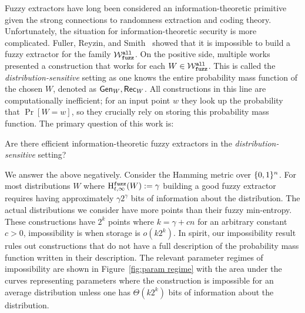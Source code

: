 Fuzzy extractors have long been considered an information-theoretic primitive given the strong connections to randomness extraction and coding theory.  Unfortunately, the situation for information-theoretic security is more complicated.  Fuller, Reyzin, and Smith~\cite{fuller2020fuzzy} showed that it is impossible to build a fuzzy extractor for the family $\mathcal{W}_{\mathtt{fuzz}}^{\mathtt{all}}$.  On the positive side, multiple works~\cite{hayashi2014secret,hayashi2016secret,fuller2016fuzzy,woodage2017new,tyagi2017universal,TVW18,LA18,fuller2019continuous,fuller2020fuzzy} presented a construction that works for each $W\in \mathcal{W}_{\mathtt{fuzz}}^{\mathtt{all}}$.  This is called the \emph{distribution-sensitive} setting as one knows the entire probability mass function of the chosen $W$, denoted as ${\mathsf{Gen}}_W, {\mathsf{Rec}}_W$.  All constructions in this line are computationally inefficient; for an input point $w$ they look up the probability that $\Pr[W=w]$, so they crucially rely on storing this probability mass function.  
The primary question of this work is:
\begin{displayquote}
Are there efficient information-theoretic fuzzy extractors in the \emph{distribution-sensitive} setting? 
\end{displayquote}

We answer the above negatively.  Consider the Hamming metric over $\{0, 1\}^n$. For most distributions $W$ where $\mathrm{H}^{\mathtt{fuzz}}_{t,\infty}(W) := \gamma$ building a good fuzzy extractor requires having approximately $\gamma 2^\gamma$ bits of information about the distribution. The actual distributions we consider have more points than their fuzzy min-entropy.  These constructions have $2^k$ points where $k = \gamma + c n$ for an arbitrary constant $c>0$, impossibility is when storage is $o(k2^k)$.  In spirit, our impossibility result rules out constructions that do not have a full description of the probability mass function written in their description.  The relevant parameter regimes of impossibility are shown in Figure~\ref{fig:param regime} with the area under the curves representing parameters where the construction is impossible for an average distribution unless one has $\Theta(k 2^k)$ bits of information about the distribution.  


